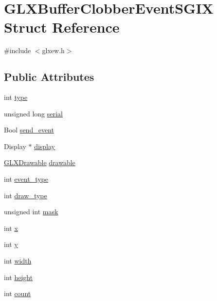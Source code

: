 \hypertarget{struct_g_l_x_buffer_clobber_event_s_g_i_x}{}\section{G\+L\+X\+Buffer\+Clobber\+Event\+S\+G\+IX Struct Reference}
\label{struct_g_l_x_buffer_clobber_event_s_g_i_x}


{\ttfamily \#include $<$glxew.\+h$>$}

\subsection*{Public Attributes}
\begin{DoxyCompactItemize}
\item 
int \mbox{\hyperlink{struct_g_l_x_buffer_clobber_event_s_g_i_x_a36e3e8a5feea664623ea43d0f273b63a}{type}}
\item 
unsigned long \mbox{\hyperlink{struct_g_l_x_buffer_clobber_event_s_g_i_x_ac295e3276a7986eeae4d6a2a28c7e0b7}{serial}}
\item 
Bool \mbox{\hyperlink{struct_g_l_x_buffer_clobber_event_s_g_i_x_af43bf0edbe40a74ef58dfb546a75118b}{send\+\_\+event}}
\item 
Display $\ast$ \mbox{\hyperlink{struct_g_l_x_buffer_clobber_event_s_g_i_x_afef060d81026da75c846727f4a3de9d4}{display}}
\item 
\mbox{\hyperlink{glxew_8h_a826f51745d9d6c81bdbac47ae2b80cf7}{G\+L\+X\+Drawable}} \mbox{\hyperlink{struct_g_l_x_buffer_clobber_event_s_g_i_x_a9c45674193ed80a79261c3b7518ee04f}{drawable}}
\item 
int \mbox{\hyperlink{struct_g_l_x_buffer_clobber_event_s_g_i_x_a0b405123f1d6528f1f4dfa7ff92bde9b}{event\+\_\+type}}
\item 
int \mbox{\hyperlink{struct_g_l_x_buffer_clobber_event_s_g_i_x_a25c31e8cbec0919f74a1e93ae74175b1}{draw\+\_\+type}}
\item 
unsigned int \mbox{\hyperlink{struct_g_l_x_buffer_clobber_event_s_g_i_x_a74b4ad1ad3cac011001151411f621da1}{mask}}
\item 
int \mbox{\hyperlink{struct_g_l_x_buffer_clobber_event_s_g_i_x_a5118d48c3c8d5253d39922b5014b52ff}{x}}
\item 
int \mbox{\hyperlink{struct_g_l_x_buffer_clobber_event_s_g_i_x_aef21efa11558a5b67861f96471c56003}{y}}
\item 
int \mbox{\hyperlink{struct_g_l_x_buffer_clobber_event_s_g_i_x_adad23535733161528427584a42bfc6eb}{width}}
\item 
int \mbox{\hyperlink{struct_g_l_x_buffer_clobber_event_s_g_i_x_a7838dbabb76c22aa8241310a3f2363ea}{height}}
\item 
int \mbox{\hyperlink{struct_g_l_x_buffer_clobber_event_s_g_i_x_ad8f4f0aae058e0a1ff542679823e37a9}{count}}
\end{DoxyCompactItemize}


